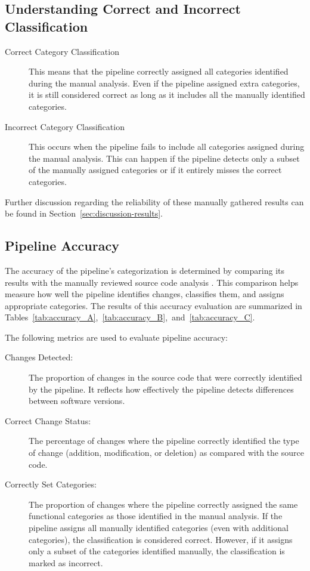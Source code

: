 \subsection{Understanding Correct and Incorrect Classification}
\label{sec:result:understanding_correct_incorrect}
\begin{description}
    \item[Correct Category Classification] This means that the pipeline correctly assigned all categories identified during the manual analysis. Even if the pipeline assigned extra categories, it is still considered correct as long as it includes all the manually identified categories.

    \item[Incorrect Category Classification] This occurs when the pipeline fails to include all categories assigned during the manual analysis. This can happen if the pipeline detects only a subset of the manually assigned categories or if it entirely misses the correct categories.
\end{description}

Further discussion regarding the reliability of these manually gathered results can be found in Section~\ref{sec:discussion-results}.


\subsection{Pipeline Accuracy}

The accuracy of the pipeline’s categorization is determined by comparing its results with the manually reviewed source code analysis \cite{githubSignal}. This comparison helps measure how well the pipeline identifies changes, classifies them, and assigns appropriate categories. The results of this accuracy evaluation are summarized in Tables~\ref{tab:accuracy_A},~\ref{tab:accuracy_B},~and~\ref{tab:accuracy_C}.

\noindent
The following metrics are used to evaluate pipeline accuracy:

\begin{description}
    \item[Changes Detected:] The proportion of changes in the source code that were correctly identified by the pipeline. It reflects how effectively the pipeline detects differences between software versions.

    \item[Correct Change Status:] The percentage of changes where the pipeline correctly identified the type of change (addition, modification, or deletion) as compared with the source code.

    \item[Correctly Set Categories:] The proportion of changes where the pipeline correctly assigned the same functional categories as those identified in the manual analysis. If the pipeline assigns all manually identified categories (even with additional categories), the classification is considered correct. However, if it assigns only a subset of the categories identified manually, the classification is marked as incorrect.
\end{description}

